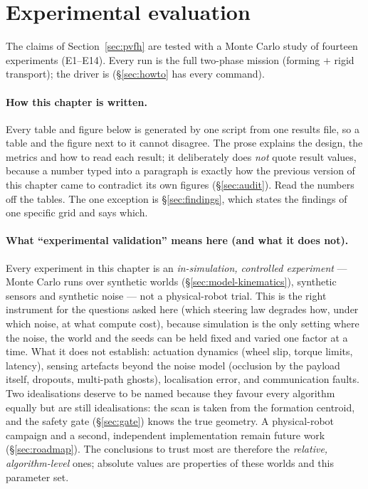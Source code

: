 \section{Experimental evaluation}
\label{sec:experiments}

The claims of Section~\ref{sec:pvfh} are tested with a Monte Carlo study of
fourteen experiments (E1--E14). Every run is the full two-phase mission (forming
$+$ rigid transport); the driver is 
(\S\ref{sec:howto} has every command).



\paragraph{How this chapter is written.} Every table and figure below is
generated by one script from one results file, so a table and the figure
next to it cannot disagree. The prose explains the design, the metrics and
how to read each result; it deliberately does \emph{not} quote result
values, because a number typed into a paragraph is exactly how the previous
version of this chapter came to contradict its own figures
(\S\ref{sec:audit}). Read the numbers off the tables. The one exception is
\S\ref{sec:findings}, which states the findings of one specific grid and
says which.

\paragraph{What ``experimental validation'' means here (and what it does
not).} \label{sec:simvalidation}
Every experiment in this chapter is an \emph{in-simulation, controlled
experiment} --- Monte Carlo runs over synthetic worlds
(\S\ref{sec:model-kinematics}), synthetic sensors and synthetic noise ---
not a physical-robot trial. This is the right instrument for the questions
asked here (which steering law degrades how, under which noise, at what
compute cost), because simulation is the only setting where the noise, the
world and the seeds can be held fixed and varied one factor at a time. What
it does not establish: actuation dynamics (wheel slip, torque limits,
latency), sensing artefacts beyond the noise model (occlusion by the
payload itself, dropouts, multi-path ghosts), localisation error, and
communication faults. Two idealisations deserve to be named because they
favour every algorithm equally but are still idealisations: the scan is
taken from the formation centroid, and the safety gate
(\S\ref{sec:gate}) knows the true geometry. A physical-robot campaign and a
second, independent implementation remain future work
(\S\ref{sec:roadmap}). The conclusions to trust most are therefore the
\emph{relative, algorithm-level} ones; absolute values are properties of
these worlds and this parameter set.

